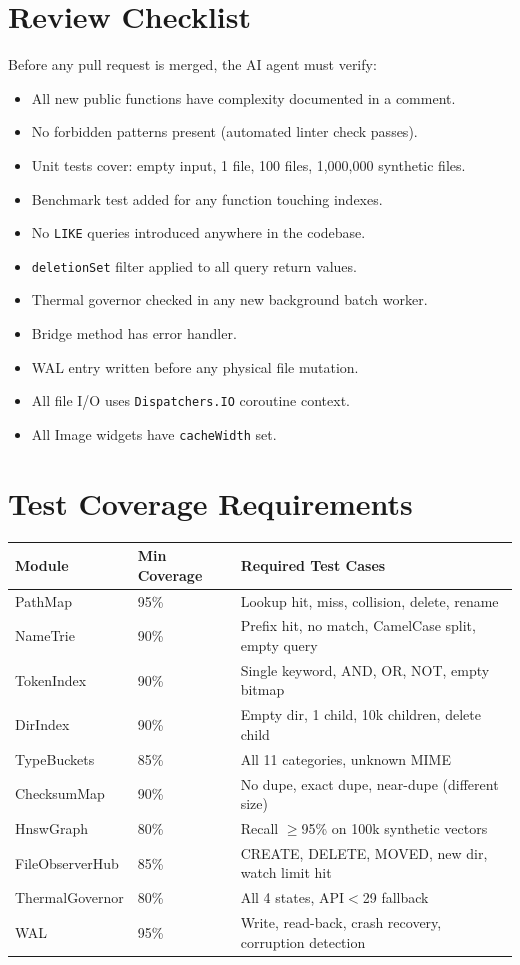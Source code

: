 \section{Review Checklist}

Before any pull request is merged, the AI agent must verify:
\begin{itemize}
  \item[$\square$] All new public functions have complexity documented in a comment.
  \item[$\square$] No forbidden patterns present (automated linter check passes).
  \item[$\square$] Unit tests cover: empty input, 1 file, 100 files, 1,000,000 synthetic files.
  \item[$\square$] Benchmark test added for any function touching indexes.
  \item[$\square$] No \texttt{LIKE} queries introduced anywhere in the codebase.
  \item[$\square$] \texttt{deletionSet} filter applied to all query return values.
  \item[$\square$] Thermal governor checked in any new background batch worker.
  \item[$\square$] Bridge method has error handler.
  \item[$\square$] WAL entry written before any physical file mutation.
  \item[$\square$] All file I/O uses \texttt{Dispatchers.IO} coroutine context.
  \item[$\square$] All Image widgets have \texttt{cacheWidth} set.
\end{itemize}

\section{Test Coverage Requirements}

\begin{longtable}{@{}p{38mm}p{22mm}p{80mm}@{}}
\toprule
\textbf{Module} & \textbf{Min Coverage} & \textbf{Required Test Cases} \\
\midrule
PathMap & 95\% & Lookup hit, miss, collision, delete, rename \\
NameTrie & 90\% & Prefix hit, no match, CamelCase split, empty query \\
TokenIndex & 90\% & Single keyword, AND, OR, NOT, empty bitmap \\
DirIndex & 90\% & Empty dir, 1 child, 10k children, delete child \\
TypeBuckets & 85\% & All 11 categories, unknown MIME \\
ChecksumMap & 90\% & No dupe, exact dupe, near-dupe (different size) \\
HnswGraph & 80\% & Recall $\geq$95\% on 100k synthetic vectors \\
FileObserverHub & 85\% & CREATE, DELETE, MOVED, new dir, watch limit hit \\
ThermalGovernor & 80\% & All 4 states, API$<$29 fallback \\
WAL & 95\% & Write, read-back, crash recovery, corruption detection \\
\bottomrule
\end{longtable}
